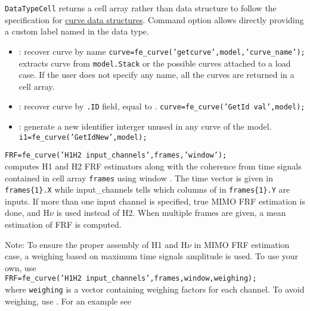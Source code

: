{\tt DataTypeCell} returns a cell array rather than data structure to follow the specification for \hyperlink{curve}{curve data structures}. Command option  allows directly providing a custom label named  in the data type.

\begin{itemize}
\item {}: recover curve by name
{\tt curve=fe\_curve('getcurve',model,'curve\_name');} \\
extracts curve  from {\tt model.Stack} or the possible curves attached to a load case. If the user does not specify any name, all the curves are returned in a cell array.
\item {}: recover curve by {\tt .ID} field, equal to . {\tt curve=fe\_curve('GetId val',model);}
\item {}: generate a new identifier interger unused in any curve of the model.
{\tt i1=fe\_curve('GetIdNew',model);}
\end{itemize}

{\tt FRF=fe\_curve('H1H2 input\_channels',frames,'window');} \\
computes H1 and H2 FRF estimators along with the coherence from time signals contained in cell array {\tt frames} using window . The time vector is given in {\tt frames\{1\}.X} while {\ti input\_channels} tells which columns of in {\tt frames\{1\}.Y} are inputs. If more than one input channel is specified, true MIMO FRF estimation is done, and H$\nu$ is used instead of H2. When multiple frames are given, a mean estimation of FRF is computed. 

Note: To ensure the proper assembly of H1 and H$\nu$ in MIMO FRF estimation case, a weighing based on maximum time signals amplitude is used. To use your own, use \\
{\tt FRF=fe\_curve('H1H2 input\_channels',frames,window,weighing);} \\
where {\tt weighing} is a vector containing weighing factors for each channel. To avoid weighing, use  . For an example see 



